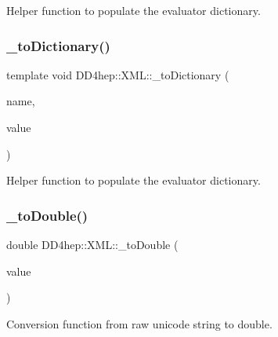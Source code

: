 Helper function to populate the evaluator dictionary. 

\hypertarget{group___d_d4_h_e_p___x_m_l_ga7a346eee87fe45320da3ebb2e1958af5}{}\label{group___d_d4_h_e_p___x_m_l_ga7a346eee87fe45320da3ebb2e1958af5} 
\subsubsection{\texorpdfstring{\+\_\+to\+Dictionary()}{\_toDictionary()}\hspace{0.1cm}{\footnotesize\ttfamily [4/4]}}
{\footnotesize\ttfamily template void D\+D4hep\+::\+X\+M\+L\+::\+\_\+to\+Dictionary (\begin{DoxyParamCaption}\item[{const \hyperlink{namespace_d_d4hep_1_1_x_m_l_a09e5d9cc86ed782f6826dfe0778c1815}{Xml\+Char} $\ast$}]{name,  }\item[{double}]{value }\end{DoxyParamCaption})}



Helper function to populate the evaluator dictionary. 

\hypertarget{group___d_d4_h_e_p___x_m_l_gace8029e843a4c94cf50bd9adc32cd6f6}{}\label{group___d_d4_h_e_p___x_m_l_gace8029e843a4c94cf50bd9adc32cd6f6} 
\subsubsection{\texorpdfstring{\+\_\+to\+Double()}{\_toDouble()}}
{\footnotesize\ttfamily double D\+D4hep\+::\+X\+M\+L\+::\+\_\+to\+Double (\begin{DoxyParamCaption}\item[{const \hyperlink{namespace_d_d4hep_1_1_x_m_l_a09e5d9cc86ed782f6826dfe0778c1815}{Xml\+Char} $\ast$}]{value }\end{DoxyParamCaption})}



Conversion function from raw unicode string to double. 



